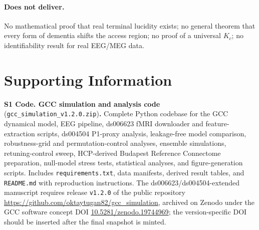 \documentclass[11pt,a4paper]{article}
\theoremstyle{plain}
\theoremstyle{definition}
\theoremstyle{remark}
\begin{document}
\paragraph{Does not deliver.}
No mathematical proof that real terminal lucidity exists; no general theorem that every form of dementia shifts the access region; no proof of a universal $K_c$; no identifiability result for real EEG/MEG data.


\section*{Supporting Information}

\noindent\textbf{S1 Code. GCC simulation and analysis code} (\texttt{gcc\_simulation\_v1.2.0.zip})\textbf{.} Complete Python codebase for the GCC dynamical model, EEG pipeline, ds006623 fMRI downloader and feature-extraction scripts, ds004504 P1-proxy analysis, leakage-free model comparison, robustness-grid and permutation-control analyses, ensemble simulations, retuning-control sweep, HCP-derived Budapest Reference Connectome preparation, null-model stress tests, statistical analyses, and figure-generation scripts. Includes \texttt{requirements.txt}, data manifests, derived result tables, and \texttt{README.md} with reproduction instructions. The ds006623/ds004504-extended manuscript requires release \texttt{v1.2.0} of the public repository \url{https://github.com/oktaytugan82/gcc_simulation}, archived on Zenodo under the GCC software concept DOI \href{https://doi.org/10.5281/zenodo.19744969}{10.5281/zenodo.19744969}; the version-specific DOI should be inserted after the final snapshot is minted.
\end{document}
